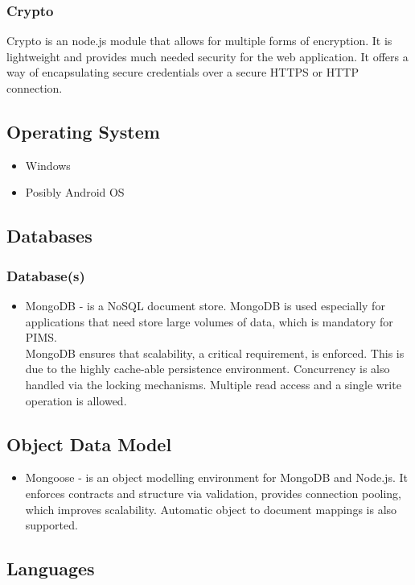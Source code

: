 \subsubsection{Crypto}
Crypto is an node.js module that allows for multiple forms of encryption. It is lightweight and provides much needed security for the web application. It offers a way of encapsulating secure credentials over a secure HTTPS or HTTP connection.

\subsection{Operating System}
\begin{itemize}
		\item Windows
		\item Posibly Android OS
\end{itemize}
	
	
\subsection{Databases}
\subsubsection{Database(s)}
\begin{itemize}
	\item MongoDB - is a NoSQL document store. MongoDB is used especially for applications that need store large volumes of data, which is mandatory for PIMS. \\
	MongoDB ensures that scalability, a critical requirement, is enforced. This is due to the highly cache-able persistence environment. Concurrency is also handled  via the locking mechanisms. Multiple read access and a single write operation is allowed.
\end{itemize}
	

\subsection{Object Data Model}
\begin{itemize}
	\item Mongoose - is an object modelling environment for MongoDB and Node.js. It enforces contracts and structure via validation, provides connection pooling, which improves scalability. Automatic object to document mappings is also supported.
\end{itemize}

\subsection{Languages}
